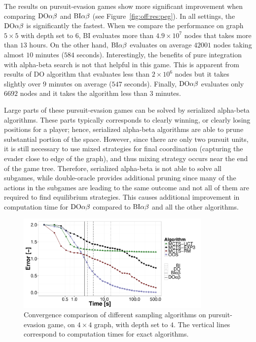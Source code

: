 The results on pursuit-evasion games show more significant improvement when comparing $\textrm{DO}\alpha\beta$ and $\textrm{BI}\alpha\beta$ (see Figure~\ref{fig:off:res:peg}). In all settings, the $\textrm{DO}\alpha\beta$ is significantly the fastest. When we compare the performance on graph $5\times5$ with depth set to $6$, \textsc{BI} evaluates more than $4.9\times10^7$ nodes that takes more than $13$ hours. On the other hand, $\textrm{BI}\alpha\beta$ evaluates on average $42001$ nodes taking almost $10$ minutes ($584$ seconds). Interestingly, the benefits of pure integration with alpha-beta search is not that helpful in this game.
This is apparent from results of \textsc{DO} algorithm that evaluates less than $2\times10^6$ nodes but it takes slightly over $9$ minutes on average ($547$ seconds). Finally, $\textrm{DO}\alpha\beta$ evaluates only $6692$ nodes and it takes the algorithm less than $3$ minutes.

Large parts of these pursuit-evasion games can be solved by serialized alpha-beta algorithms.
These parts typically corresponds to clearly winning, or clearly losing positions for a player; hence, serialized alpha-beta algorithms are able to prune substantial portion of the space. 
However, since there are only two pursuit units, it is still necessary to use mixed strategies for final coordination (capturing the evader close to edge of the graph), and thus mixing strategy occurs near the end of the game tree. 
Therefore, serialized alpha-beta is not able to solve all subgames, while double-oracle provides additional pruning since many of the actions in the subgames are leading to the same outcome and not all of them are required to find equilibrium strategies.
This causes additional improvement in computation time for $\textrm{DO}\alpha\beta$ compared to $\textrm{BI}\alpha\beta$ and all the other algorithms.%

\begin{figure}
\centering
\includegraphics[width=0.85\textwidth]{figures/convergence-peg.pdf}
\caption{Convergence comparison of different sampling algorithms on pursuit-evasion game, on $4\times4$ graph, with depth set to $4$. The vertical lines correspond to computation times for exact algorithms.} \label{fig:off:conv:peg}
\end{figure}

